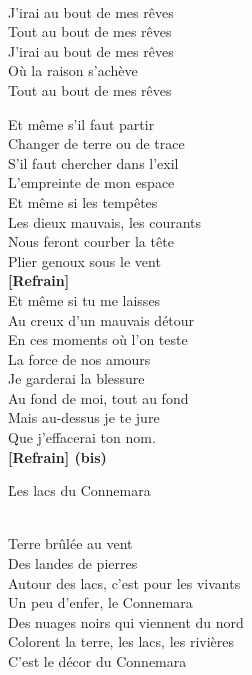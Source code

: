 \documentclass{novel}
\begin{document}
\begin{bfseries}
[Refrain:]\\
J'irai au bout de mes rêves \\
Tout au bout de mes rêves \\
J'irai au bout de mes rêves \\
Où la raison s'achève \\
Tout au bout de mes rêves \\
\end{bfseries}

Et même s'il faut partir \\
Changer de terre ou de trace \\
S'il faut chercher dans l'exil \\
L'empreinte de mon espace \\
Et même si les tempêtes \\
Les dieux mauvais, les courants \\
Nous feront courber la tête \\
Plier genoux sous le vent \\

\textbf{[Refrain]}\\

Et même si tu me laisses \\
Au creux d'un mauvais détour \\
En ces moments où l'on teste \\
La force de nos amours \\
Je garderai la blessure \\
Au fond de moi, tout au fond \\
Mais au-dessus je te jure \\
Que j'effacerai ton nom. \\

\textbf{[Refrain] (bis)}

\newpage
\small
\h*{Les lacs du Connemara}

\begin{bfseries}
[Refrain:]\\
Terre brûlée au vent \\
Des landes de pierres \\
Autour des lacs, c'est pour les vivants \\
Un peu d'enfer, le Connemara \\
Des nuages noirs qui viennent du nord \\
Colorent la terre, les lacs, les rivières \\
C'est le décor du Connemara \\
\end{bfseries}
\end{document}

